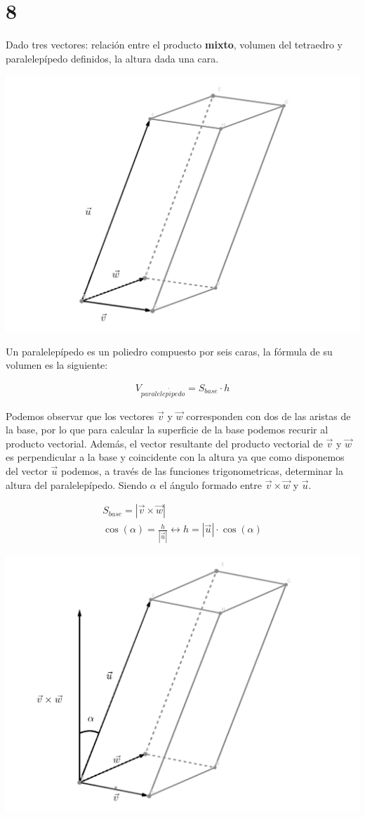 \documentclass[
	12pt, %
	spanish, %
]{fphw}
\newcommand{\vu}{\vec{u}}
\newcommand{\vv}{\vec{v}}
\newcommand{\vw}{\vec{w}}
\begin{document}
\section*{8}
\begin{problem}
	Dado tres vectores: relación entre el producto \textbf{mixto}, volumen del
tetraedro y paralelepípedo definidos, la altura dada una cara.
\end{problem}

\begin{center}
	\includegraphics[width=0.5\columnwidth]{Paralelepipedo.png} %
\end{center}

Un paralelepípedo es un poliedro compuesto por seis caras, la fórmula de su volumen es la siguiente:

\begin{gather*}
	V_{paralelep\acute{i}pedo} = S_{base} \cdot h
\end{gather*}

Podemos observar que los vectores $\vv$ y $\vw$ corresponden con dos de las aristas de la base, por lo que para calcular la superficie de la base podemos recurir al producto vectorial. Además, el vector resultante del producto vectorial de $\vv$ y $\vw$ es perpendicular a la base y  coincidente con la altura ya que como disponemos del vector $\vu$ podemos, a través de las funciones trigonometricas, determinar la altura del paralelepípedo. Siendo $\alpha$ el ángulo formado entre $\vv \times \vw$ y $\vu$.

\begin{gather*}
	S_{base} = |\vv \times \vw|\\
	\cos(\alpha) = \frac{h}{|\vu|} \leftrightarrow h=|\vu| \cdot \cos(\alpha) 
\end{gather*}
 

\begin{center}
	\includegraphics[width=0.6\columnwidth]{geogebra-export.png} %
\end{center}
\end{document}
